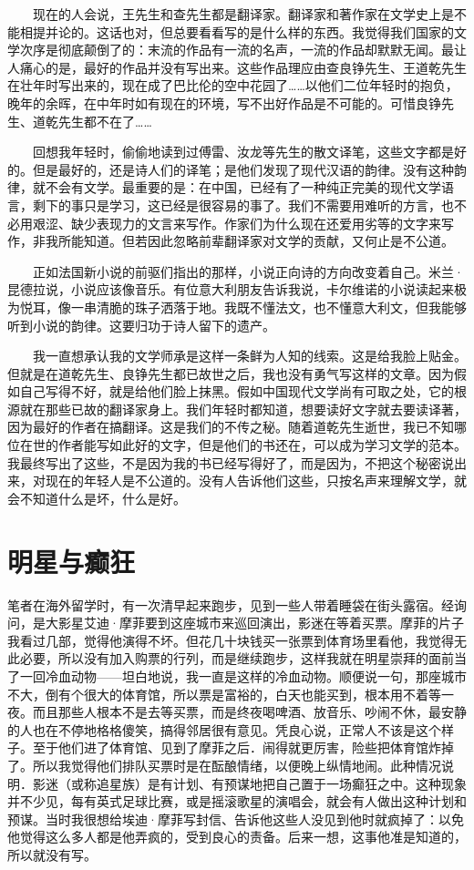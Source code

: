 　　现在的人会说，王先生和查先生都是翻译家。翻译家和著作家在文学史上是不能相提并论的。这话也对，但总要看看写的是什么样的东西。我觉得我们国家的文学次序是彻底颠倒了的：末流的作品有一流的名声，一流的作品却默默无闻。最让人痛心的是，最好的作品并没有写出来。这些作品理应由查良铮先生、王道乾先生在壮年时写出来的，现在成了巴比伦的空中花园了……以他们二位年轻时的抱负，晚年的余晖，在中年时如有现在的环境，写不出好作品是不可能的。可惜良铮先生、道乾先生都不在了……　 

　　回想我年轻时，偷偷地读到过傅雷、汝龙等先生的散文译笔，这些文字都是好的。但是最好的，还是诗人们的译笔；是他们发现了现代汉语的韵律。没有这种韵律，就不会有文学。最重要的是：在中国，已经有了一种纯正完美的现代文学语言，剩下的事只是学习，这已经是很容易的事了。我们不需要用难听的方言，也不必用艰涩、缺少表现力的文言来写作。作家们为什么现在还爱用劣等的文字来写作，非我所能知道。但若因此忽略前辈翻译家对文学的贡献，又何止是不公道。　 

　　正如法国新小说的前驱们指出的那样，小说正向诗的方向改变着自己。米兰·昆德拉说，小说应该像音乐。有位意大利朋友告诉我说，卡尔维诺的小说读起来极为悦耳，像一串清脆的珠子洒落于地。我既不懂法文，也不懂意大利文，但我能够听到小说的韵律。这要归功于诗人留下的遗产。　 

　　我一直想承认我的文学师承是这样一条鲜为人知的线索。这是给我脸上贴金。但就是在道乾先生、良铮先生都已故世之后，我也没有勇气写这样的文章。因为假如自己写得不好，就是给他们脸上抹黑。假如中国现代文学尚有可取之处，它的根源就在那些已故的翻译家身上。我们年轻时都知道，想要读好文字就去要读译著，因为最好的作者在搞翻译。这是我们的不传之秘。随着道乾先生逝世，我已不知哪位在世的作者能写如此好的文字，但是他们的书还在，可以成为学习文学的范本。我最终写出了这些，不是因为我的书已经写得好了，而是因为，不把这个秘密说出来，对现在的年轻人是不公道的。没有人告诉他们这些，只按名声来理解文学，就会不知道什么是坏，什么是好。　

\chapter{明星与癫狂}

笔者在海外留学时，有一次清早起来跑步，见到一些人带着睡袋在街头露宿。经询问，是大影星艾迪·摩菲要到这座城市来巡回演出，影迷在等着买票。摩菲的片子我看过几部，觉得他演得不坏。但花几十块钱买一张票到体育场里看他，我觉得无此必要，所以没有加入购票的行列，而是继续跑步，这样我就在明星崇拜的面前当了一回冷血动物——坦白地说，我一直是这样的冷血动物。顺便说一句，那座城市不大，倒有个很大的体育馆，所以票是富裕的，白天也能买到，根本用不着等一夜。而且那些人根本不是去等买票，而是终夜喝啤酒、放音乐、吵闹不休，最安静的人也在不停地格格傻笑，搞得邻居很有意见。凭良心说，正常人不该是这个样子。至于他们进了体育馆、见到了摩菲之后．闹得就更厉害，险些把体育馆炸掉了。所以我觉得他们排队买票时是在酝酿情绪，以便晚上纵情地闹。此种情况说明．影迷（或称追星族）是有计划、有预谋地把自己置于一场癫狂之中。这种现象并不少见，每有英式足球比赛，或是摇滚歌星的演唱会，就会有人做出这种计划和预谋。当时我很想给埃迪·摩菲写封信、告诉他这些人没见到他时就疯掉了：以免他觉得这么多人都是他弄疯的，受到良心的责备。后来一想，这事他准是知道的，所以就没有写。 

